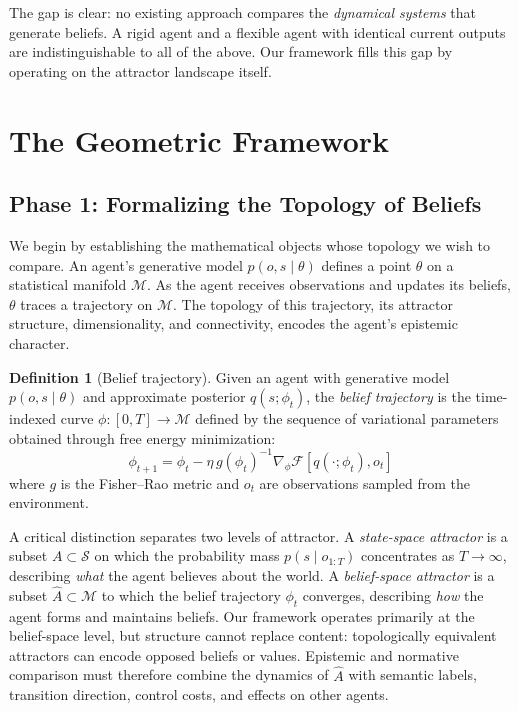 \documentclass[11pt,a4paper]{article}
\theoremstyle{definition}
\newtheorem{definition}[claim]{Definition}
\newcommand{\VFE}{\mathcal{F}}
\newcommand{\cS}{\mathcal{S}}
\newcommand{\cM}{\mathcal{M}}
\begin{document}
The gap is clear: no existing approach compares the \emph{dynamical systems} that generate beliefs. A rigid agent and a flexible agent with identical current outputs are indistinguishable to all of the above. Our framework fills this gap by operating on the attractor landscape itself.


\section{The Geometric Framework}
\label{sec:framework}

\subsection{Phase 1: Formalizing the Topology of Beliefs}
\label{sec:phase1}

We begin by establishing the mathematical objects whose topology we wish to compare. An agent's generative model $p(o, s \mid \theta)$ defines a point $\theta$ on a statistical manifold $\cM$. As the agent receives observations and updates its beliefs, $\theta$ traces a trajectory on $\cM$. The topology of this trajectory, its attractor structure, dimensionality, and connectivity, encodes the agent's epistemic character.

\begin{definition}[Belief trajectory]
\label{def:belief_trajectory}
Given an agent with generative model $p(o, s \mid \theta)$ and approximate posterior $q(s; \phi_t)$, the \emph{belief trajectory} is the time-indexed curve $\phi: [0, T] \to \cM$ defined by the sequence of variational parameters obtained through free energy minimization:
\begin{equation}
  \phi_{t+1} = \phi_t - \eta \, g(\phi_t)^{-1} \nabla_\phi \VFE[q(\cdot; \phi_t), o_t]
  \label{eq:belief_trajectory}
\end{equation}
where $g$ is the Fisher--Rao metric and $o_t$ are observations sampled from the environment.
\end{definition}

A critical distinction separates two levels of attractor. A \emph{state-space attractor} is a subset $A \subset \cS$ on which the probability mass $p(s \mid o_{1:T})$ concentrates as $T \to \infty$, describing \emph{what} the agent believes about the world. A \emph{belief-space attractor} is a subset $\hat{A} \subset \cM$ to which the belief trajectory $\phi_t$ converges, describing \emph{how} the agent forms and maintains beliefs. Our framework operates primarily at the belief-space level, but structure cannot replace content: topologically equivalent attractors can encode opposed beliefs or values. Epistemic and normative comparison must therefore combine the dynamics of $\hat{A}$ with semantic labels, transition direction, control costs, and effects on other agents.
\end{document}
